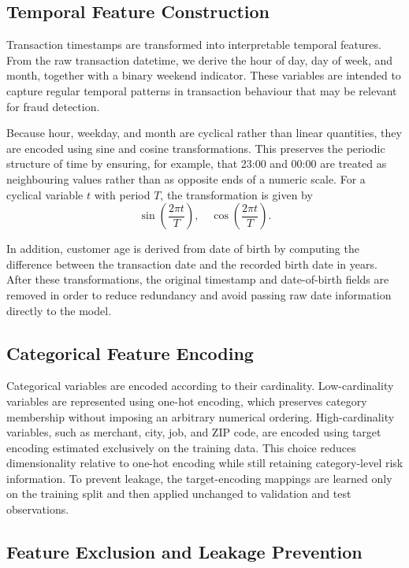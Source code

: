 \documentclass[oneside,12pt,parskip=half,american,numbers=noenddot]{scrreprt}
\begin{document}
\subsection{Temporal Feature Construction}
Transaction timestamps are transformed into interpretable temporal features. From the raw transaction datetime, we derive the hour of day, day of week, and month, together with a binary weekend indicator. These variables are intended to capture regular temporal patterns in transaction behaviour that may be relevant for fraud detection.

Because hour, weekday, and month are cyclical rather than linear quantities, they are encoded using sine and cosine transformations. This preserves the periodic structure of time by ensuring, for example, that 23:00 and 00:00 are treated as neighbouring values rather than as opposite ends of a numeric scale. For a cyclical variable \( t \) with period \( T \), the transformation is given by
\[
\sin\left( \frac{2\pi t}{T} \right), \quad
\cos\left( \frac{2\pi t}{T} \right).
\]

In addition, customer age is derived from date of birth by computing the difference between the transaction date and the recorded birth date in years. After these transformations, the original timestamp and date-of-birth fields are removed in order to reduce redundancy and avoid passing raw date information directly to the model.


\subsection{Categorical Feature Encoding}
Categorical variables are encoded according to their cardinality. Low-cardinality variables are represented using one-hot encoding, which preserves category membership without imposing an arbitrary numerical ordering. High-cardinality variables, such as merchant, city, job, and ZIP code, are encoded using target encoding estimated exclusively on the training data. This choice reduces dimensionality relative to one-hot encoding while still retaining category-level risk information. To prevent leakage, the target-encoding mappings are learned only on the training split and then applied unchanged to validation and test observations.

\subsection{Feature Exclusion and Leakage Prevention}
\label{sec:feature_exclusion}
\end{document}
